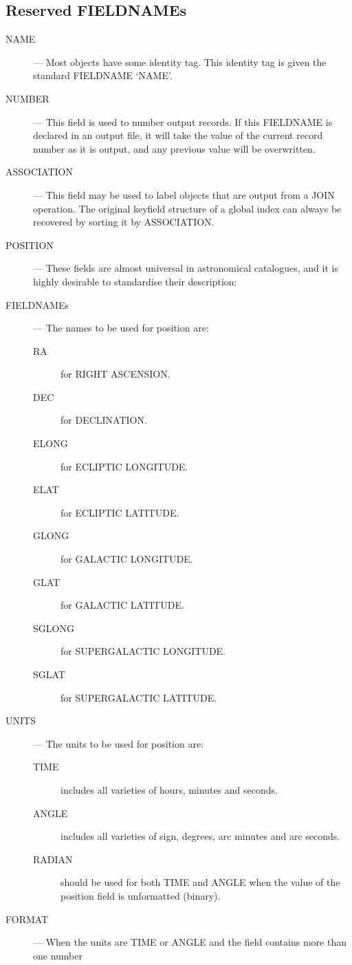 \subsection {Reserved FIELDNAMEs}
\begin{description}
\item[NAME] ---
Most objects have some identity tag.
This identity tag is given the standard FIELDNAME `NAME'.
\item[NUMBER] ---
This field is used to number output records.
If this FIELDNAME is declared in an output file, it will take the value of the
current record number as it is output, and any previous value will be
overwritten.
\item[ASSOCIATION] ---
This field may be used to label objects that are output from a JOIN operation.
The original keyfield structure of a global index can always be recovered by
sorting it by ASSOCIATION.
\item[POSITION] ---
These fields are almost universal in astronomical catalogues, and it is highly
desirable to standardise their description:
\item[FIELDNAMEs] ---
The names to be used for position are:
\begin{description}
\item [RA] for RIGHT ASCENSION.
\item [DEC] for DECLINATION.
\item [ELONG] for ECLIPTIC LONGITUDE.
\item [ELAT] for ECLIPTIC LATITUDE.
\item [GLONG] for GALACTIC LONGITUDE.
\item [GLAT] for GALACTIC LATITUDE.
\item [SGLONG] for SUPERGALACTIC LONGITUDE.
\item [SGLAT] for SUPERGALACTIC LATITUDE.
\end{description}
\item[UNITS] ---
The units to be used for position are:
\begin{description}
\item [TIME] includes all varieties of hours, minutes and seconds.
\item [ANGLE] includes all varieties of sign, degrees, arc minutes and arc seconds.
\item [RADIAN] should be used for both TIME and ANGLE when the value of the position
field is unformatted (binary).
\end{description}
\item[FORMAT] ---
When the units are TIME or ANGLE and the field contains more than one number

\end{description}

